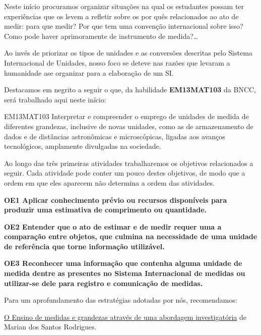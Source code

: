 \creditos

\mainmatter

\label{\detokenize{NO103::doc}}\label{\detokenize{NO103:unidades-de-medidas-e-ordem-de-grandeza}}

\def\currentcolor{session1}
\begin{texto}
{
Neste início procuramos organizar situações na qual os estudantes possam ter experiências que os levem a refletir sobre os por quês relacionados ao ato de medir: para que medir? Por que tem uma convenção internacional sobre isso? Como pode haver aprimoramente de instrumento de medida?…

Ao invés de priorizar os tipos de unidades e as conversões descritas pelo Sistema Internacional de Unidades, nosso foco se deteve nas razões que levaram a humanidade ase organizar para a elaboração de um SI.

Destacamos em negrito a seguir o que, da habilidade \textbf{EM13MAT103} da BNCC, será trabalhado aqui neste início:

\begin{habilities}{EM13MAT103}
Interpretar e compreender o emprego de unidades de medida de diferentes grandezas, inclusive de novas unidades, como as de armazenamento de dados e de distâncias astronômicas e microscópicas, ligadas aos avanços tecnológicos, amplamente divulgadas na sociedade.
\end{habilities}


Ao longo das três primeiras atividades trabalharemos os objetivos relacionados a seguir. Cada atividade pode conter um pouco destes objetivos, de modo que a ordem em que eles aparecem não determina a ordem das atividades.

\textbf{OE1 Aplicar conhecimento prévio ou recursos disponíveis para produzir uma estimativa de comprimento ou quantidade.}

\textbf{OE2 Entender que o ato de estimar e de medir requer uma a comparação entre objetos, que culmina na necessidade de uma unidade de referência que torne informação utilizável.}

\textbf{OE3 Reconhecer uma informação que contenha alguma unidade de medida dentre as presentes no Sistema Internacional de medidas ou utilizar-se dele para registro e comunicação de medidas.}

Para um aprofundamento das estratégias adotadas por nós, recomendamos:

\href{https://repositorio.ufrn.br/jspui/bitstream/123456789/16034/1/MarianSR.pdf}{O Ensino de medidas e grandezas através de uma abordagem investigatória} de Marian dos Santos Rodrigues.
}
\end{texto}
